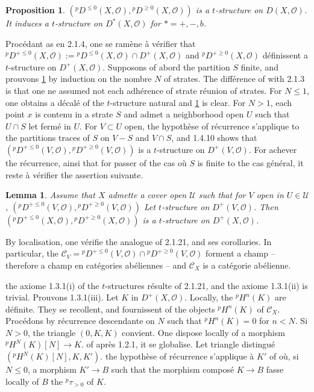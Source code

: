 \documentclass[12pt,a4paper]{article}
\theoremstyle{plain}
\newtheorem{lemma}[theorem]{Lemma}
\newtheorem{proposition}[theorem]{Proposition}
\theoremstyle{definition}
\newcommand{\cC}{\mathcal{C}}
\newcommand{\cO}{\mathcal{O}}
\newcommand{\cU}{\mathcal{U}}
\providecommand{\cC}{\mathcal{C}}
\providecommand{\cO}{\mathcal{O}}
\providecommand{\cU}{\mathcal{U}}
\begin{document}
\begin{proposition}\label{prop:3.2.20}
$({}^{p}D^{\leq 0}(X,\cO), {}^{p}D^{\geq 0}(X,\cO))$ is a $t$-structure on $D(X,\cO)$. It induces a $t$-structure on $D^{*}(X,\cO)$ for $* = +, -, b$.
\end{proposition}

Proc\'{e}dant as en 2.1.4, one se ram\`{e}ne \`{a} v\'{e}rifier that ${}^{p}D^{+ \leq 0}(X,\cO) := {}^{p}D^{\leq 0}(X,\cO) \cap D^{+}(X,\cO)$ and ${}^{p}D^{+ \geq 0}(X,\cO)$ d\'{e}finissent a $t$-structure on $D^{+}(X,\cO)$. Supposons of abord the partition $S$ finite, and prouvons \ref{prop:3.2.20} by induction on the nombre $N$ of strates. The diff\'{e}rence of with 2.1.3 is that one ne assumed not each adh\'{e}rence of strate r\'{e}union of strates. For $N \leq 1$, one obtains a d\'{e}cal\'{e} of the $t$-structure natural and \ref{prop:3.2.20} is clear. For $N > 1$, each point $x$ is contenu in a strate $S$ and admet a neighborhood open $U$ such that $U \cap S$ let ferm\'{e} in $U$. For $V \subset U$ open, the hypoth\`{e}se of r\'{e}currence s'applique to the partitions traces of $S$ on $V-S$ and $V \cap S$, and 1.4.10 shows that $({}^{p}D^{+ \leq 0}(V,\cO), {}^{p}D^{+ \geq 0}(V,\cO))$ is a $t$-structure on $D^{+}(V,\cO)$. For achever the r\'{e}currence, ainsi that for passer of the cas o\`{u} $S$ is finite to the cas g\'{e}n\'{e}ral, it reste \`{a} v\'{e}rifier the assertion suivante.

\begin{lemma}\label{lem:3.2.21}
Assume that $X$ admette a cover open $\cU$ such that for $V$ open in $U \in \cU$, $({}^{p}D^{+ \leq 0}(V,\cO), {}^{p}D^{+ \geq 0}(V,\cO))$ Let $t$-structure on $D^{+}(V,\cO)$. Then $({}^{p}D^{+ \leq 0}(X,\cO), {}^{p}D^{+ \geq 0}(X,\cO))$ is a $t$-structure on $D^{+}(X,\cO)$.
\end{lemma}

By localisation, one v\'{e}rifie the analogue of 2.1.21, and ses corollaries. In particular, the $\cC_{V} = {}^{p}D^{+ \leq 0}(V,\cO) \cap {}^{p}D^{+ \geq 0}(V,\cO)$ forment a champ -- therefore a champ en cat\'{e}gories ab\'{e}liennes -- and $\cC_{X}$ is a cat\'{e}gorie ab\'{e}lienne.

the axiome 1.3.1(i) of the $t$-structures r\'{e}sulte of 2.1.21, and the axiome 1.3.1(ii) is trivial. Prouvons 1.3.1(iii). Let $K$ in $D^{+}(X,\cO)$. Locally, the ${}^{p}H^{n}(K)$ are d\'{e}finite. They se recollent, and fournissent of the objects ${}^{p}H^{n}(K)$ of $\cC_{X}$. Proc\'{e}dons by r\'{e}currence descendante on $N$ such that ${}^{p}H^{n}(K) = 0$ for $n < N$. Si $N > 0$, the triangle $(0,K,K)$ convient. One dispose locally of a morphism ${}^{p}H^{N}(K)[N] \to K$. of apr\`{e}s 1.2.1, it se globalise. Let triangle distingu\'{e} $({}^{p}H^{N}(K)[N], K, K')$. the hypoth\`{e}se of r\'{e}currence s'applique \`{a} $K'$ of o\`{u}, si $N \leq 0$, a morphism $K' \to B$ such that the morphism compos\'{e} $K \longrightarrow B$ fasse locally of $B$ the ${}^{p}\tau_{>0}$ of $K$.
\end{document}
